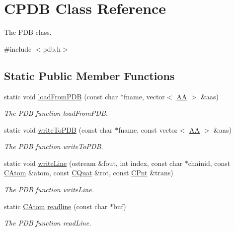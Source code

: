 \hypertarget{classCPDB}{\section{C\-P\-D\-B Class Reference}
\label{classCPDB}
}


The P\-D\-B class.  




{\ttfamily \#include $<$pdb.\-h$>$}

\subsection*{Static Public Member Functions}
\begin{DoxyCompactItemize}
\item 
static void \hyperlink{classCPDB_a3033b818c15dea1b6df7c3b354a8d044}{load\-From\-P\-D\-B} (const char $\ast$fname, vector$<$ \hyperlink{classAA}{A\-A} $>$ \&aas)
\begin{DoxyCompactList}\small\item\em The P\-D\-B function load\-From\-P\-D\-B. \end{DoxyCompactList}\item 
static void \hyperlink{classCPDB_ab30dfa8082d957c7008d2e4a2c56273b}{write\-To\-P\-D\-B} (const char $\ast$fname, const vector$<$ \hyperlink{classAA}{A\-A} $>$ \&aas)
\begin{DoxyCompactList}\small\item\em The P\-D\-B function write\-To\-P\-D\-B. \end{DoxyCompactList}\item 
static void \hyperlink{classCPDB_a1c4247e99968afb8266c6cf85d537de6}{write\-Line} (ostream \&fout, int index, const char $\ast$chainid, const \hyperlink{classCAtom}{C\-Atom} \&atom, const \hyperlink{classCQuat}{C\-Quat} \&rot, const \hyperlink{classCPnt}{C\-Pnt} \&trans)
\begin{DoxyCompactList}\small\item\em The P\-D\-B function write\-Line. \end{DoxyCompactList}\item 
static \hyperlink{classCAtom}{C\-Atom} \hyperlink{classCPDB_acdc2ba2ed5bb4dc8701577e29c0f4bf9}{readline} (const char $\ast$buf)
\begin{DoxyCompactList}\small\item\em The P\-D\-B function read\-Line. \end{DoxyCompactList}\end{DoxyCompactItemize}


